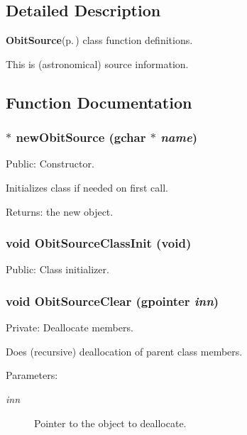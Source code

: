 \subsection{Detailed Description}
{\bf Obit\-Source}{\rm (p.\,\pageref{structObitSource})} class function definitions. 

This is (astronomical) source information.

\subsection{Function Documentation}
\subsubsection{$\ast$ new\-Obit\-Source (gchar $\ast$ {\em name})}\label{ObitSource_8c_a6}


Public: Constructor. 

Initializes class if needed on first call. \begin{Desc}
\item[Returns:]the new object. \end{Desc}
\subsubsection{\setlength{\rightskip}{0pt plus 5cm}void Obit\-Source\-Class\-Init (void)}\label{ObitSource_8c_a9}


Public: Class initializer. 

\subsubsection{\setlength{\rightskip}{0pt plus 5cm}void Obit\-Source\-Clear (gpointer {\em inn})}\label{ObitSource_8c_a4}


Private: Deallocate members. 

Does (recursive) deallocation of parent class members. \begin{Desc}
\item[Parameters:]
\begin{description}
\item[{\em inn}]Pointer to the object to deallocate. \end{description}
\end{Desc}
